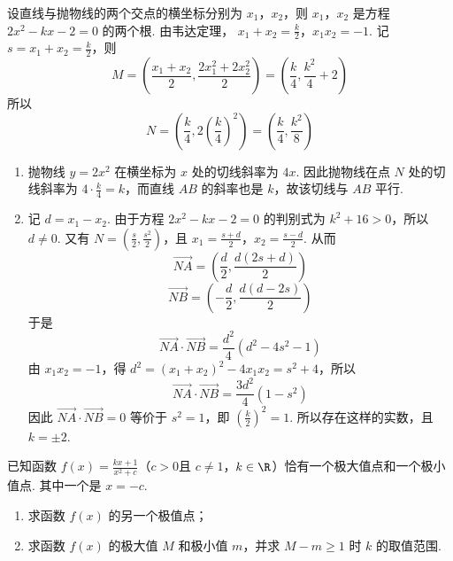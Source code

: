 \begin{solution}
设直线与抛物线的两个交点的横坐标分别为 \(x_{1}\)，\(x_{2}\)，则 \(x_{1}\)，\(x_{2}\) 是方程 \(2x^{2}-kx-2=0\) 的两个根. 由韦达定理，
\(x_{1}+x_{2}=\frac{k}{2}\)，\(x_{1}x_{2}=-1\).
记 \(s=x_{1}+x_{2}=\frac{k}{2}\)，则
\[
M=\left(\frac{x_{1}+x_{2}}{2},\frac{2x_{1}^{2}+2x_{2}^{2}}{2}\right)=\left(\frac{k}{4},\frac{k^{2}}{4}+2\right)
\]
所以
\[
N=\left(\frac{k}{4},2\left(\frac{k}{4}\right)^{2}\right)=\left(\frac{k}{4},\frac{k^{2}}{8}\right)
\]

\begin{enumerate}
\item 抛物线 \(y=2x^{2}\) 在横坐标为 \(x\) 处的切线斜率为 \(4x\). 因此抛物线在点 \(N\) 处的切线斜率为 \(4\cdot\frac{k}{4}=k\)，而直线 \(AB\) 的斜率也是 \(k\)，故该切线与 \(AB\) 平行.

\item 记 \(d=x_{1}-x_{2}\). 由于方程 \(2x^{2}-kx-2=0\) 的判别式为 \(k^{2}+16>0\)，所以 \(d\neq0\). 又有 \(N=\left(\frac{s}{2},\frac{s^{2}}{2}\right)\)，且
\(x_{1}=\frac{s+d}{2}\)，\(x_{2}=\frac{s-d}{2}\).
从而
\[
\overrightarrow{NA}=\left(\frac{d}{2},\frac{d(2s+d)}{2}\right)
\]
\[
\overrightarrow{NB}=\left(-\frac{d}{2},\frac{d(d-2s)}{2}\right)
\]
于是
\[
\overrightarrow{NA}\cdot\overrightarrow{NB}=\frac{d^{2}}{4}\left(d^{2}-4s^{2}-1\right)
\]
由 \(x_{1}x_{2}=-1\)，得 \(d^{2}=(x_{1}+x_{2})^{2}-4x_{1}x_{2}=s^{2}+4\)，所以
\[
\overrightarrow{NA}\cdot\overrightarrow{NB}=\frac{3d^{2}}{4}(1-s^{2})
\]
因此 \(\overrightarrow{NA}\cdot\overrightarrow{NB}=0\) 等价于 \(s^{2}=1\)，即 \(\left(\frac{k}{2}\right)^{2}=1\). 所以存在这样的实数，且 \(k=\pm2\).
\end{enumerate}
\end{solution}

\begin{problem}
已知函数 \( f(x) = \frac{kx + 1}{x^2 + c}\)（\(c > 0\)且 \(c \neq 1\)，\(k \in \R\)）恰有一个极大值点和一个极小值点. 其中一个是 \(x = -c\).
\begin{enumerate}
\item 求函数 \( f(x) \) 的另一个极值点；
\item 求函数 \( f(x) \) 的极大值 \(M\) 和极小值 \( m \)，并求 \( M - m \geqslant 1 \) 时 \( k \) 的取值范围.
\end{enumerate}
\end{problem}

